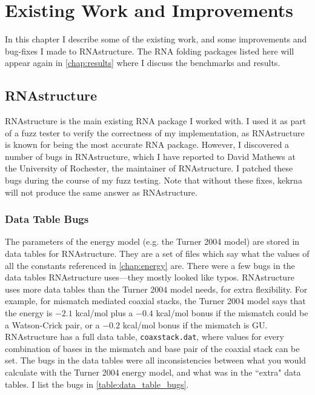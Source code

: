 \documentclass{cshonours}
\def\km{kcal/mol }
\begin{document}
\chapter{Existing Work and Improvements}
\label{chap:work}

In this chapter I describe some of the existing work, and some improvements and bug-fixes I made to RNAstructure. The RNA folding packages listed here will appear again in \autoref{chap:results} where I discuss the benchmarks and results.

\section{RNAstructure}
\label{sec:work_rnastructure}
RNAstructure is the main existing RNA package I worked with. I used it as part of a fuzz tester to verify the correctness of my implementation, as RNAstructure is known for being the most accurate RNA package. However, I discovered a number of bugs in RNAstructure, which I have reported to David Mathews \cite{mathewsPersonal} at the University of Rochester, the maintainer of RNAstructure. I patched these bugs during the course of my fuzz testing. Note that without these fixes, kekrna will not produce the same answer as RNAstructure.

\subsection{Data Table Bugs}
The parameters of the energy model (e.g. the Turner 2004 model) are stored in data tables for RNAstructure. They are a set of files which say what the values of all the constants referenced in \autoref{chap:energy} are. There were a few bugs in the data tables RNAstructure uses---they mostly looked like typos. RNAstructure uses more data tables than the Turner 2004 model needs, for extra flexibility. For example, for mismatch mediated coaxial stacks, the Turner 2004 model says that the energy is $-2.1$ \km plus a $-0.4$ \km bonus if the mismatch could be a Watson-Crick pair, or a $-0.2$ \km bonus if the mismatch is GU. RNAstructure has a full data table, \texttt{coaxstack.dat}, where values for every combination of bases in the mismatch and base pair of the coaxial stack can be set. The bugs in the data tables were all inconsistencies between what you would calculate with the Turner 2004 energy model, and what was in the ``extra" data tables. I list the bugs in \autoref{table:data_table_bugs}.
\end{document}
